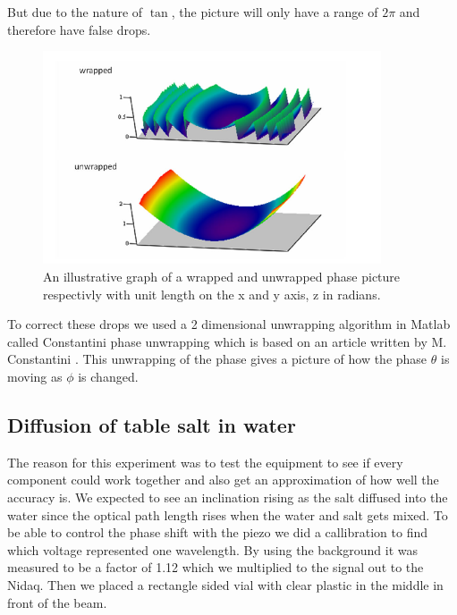 But due to the nature of $\tan$, the picture will only have a range of $2\pi$
and therefore have false drops. 
\begin {figure}[ht!]
\includegraphics [width=10cm]{bilder/unwrap.png}
\caption {\cite{omst}An illustrative graph of a wrapped and unwrapped phase picture respectivly 
with unit length on the x and y axis, z in radians.}
\end {figure}
To correct these drops we used a 2 dimensional unwrapping algorithm in Matlab called
Constantini phase unwrapping which is based on an article written by M. Constantini 
\cite{const}. This unwrapping of the phase gives a picture of how the phase $\theta$ is moving
as $\phi$ is changed. 

\subsection {Diffusion of table salt in water}

The reason for this experiment was to test the equipment to see if every component
could work together and also get an approximation of how well the accuracy is.
We expected to see an inclination rising as the salt diffused into the water since
the optical path length rises when the water and salt gets mixed.
To be able to control the phase shift with the piezo we did a callibration to find
which voltage represented one wavelength. By using the background it was measured to
be a factor of 1.12 which we multiplied to the signal out to the Nidaq. Then we placed a rectangle 
sided vial with clear plastic in the middle in front of the beam.


